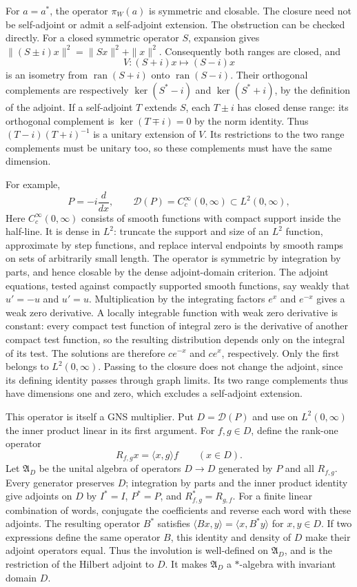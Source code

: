 For $a=a^*$, the operator $\pi_W(a)$ is symmetric and closable.
The closure need not be self-adjoint or admit a self-adjoint extension.
The obstruction can be checked directly.  For a closed symmetric operator
$S$, expansion gives
$\|(S\pm i)x\|^2=\|Sx\|^2+\|x\|^2$.
Consequently both ranges are closed, and
\[
 V:(S+i)x\longmapsto(S-i)x
\]
is an isometry from $\operatorname{ran}(S+i)$ onto
$\operatorname{ran}(S-i)$.  Their orthogonal complements are respectively
$\ker(S^*-i)$ and $\ker(S^*+i)$, by the definition of the adjoint.
If a self-adjoint $T$ extends $S$, each $T\pm i$ has closed dense range:
its orthogonal complement is $\ker(T\mp i)=0$ by the norm identity.
Thus $(T-i)(T+i)^{-1}$ is a unitary extension of $V$.
Its restrictions to the two range complements must be unitary too, so
these complements must have the same dimension.

For example,
\[
 P=-i\frac{d}{dx},\qquad \mathcal D(P)=C_c^\infty(0,\infty)
 \subset L^2(0,\infty),
\]
Here $C_c^\infty(0,\infty)$ consists of smooth functions with compact
support inside the half-line.  It is dense in $L^2$: truncate the support
and size of an $L^2$ function, approximate by step functions, and replace interval endpoints
by smooth ramps on sets of arbitrarily small length.  The operator is
symmetric by integration by parts, and hence closable by the dense
adjoint-domain criterion.  The adjoint equations, tested against compactly
supported smooth functions, say weakly that $u'=-u$ and $u'=u$.
Multiplication by the integrating factors $e^x$ and $e^{-x}$ gives a weak
zero derivative.  A locally integrable function with weak zero derivative
is constant: every compact test function of integral zero is the derivative
of another compact test function, so the resulting distribution depends
only on the integral of its test.  The solutions are therefore $ce^{-x}$
and $ce^x$, respectively.  Only the first belongs to $L^2(0,\infty)$.
Passing to the closure does not change the adjoint, since its defining
identity passes through graph limits.  Its two range complements thus
have dimensions one and zero, which excludes a self-adjoint extension.

This operator is itself a GNS multiplier.  Put $D=\mathcal D(P)$ and use
on $L^2(0,\infty)$ the inner product linear in its first argument.
For $f,g\in D$, define the rank-one operator
\[
 R_{f,g}x=\langle x,g\rangle f\qquad(x\in D).
\]
Let $\mathfrak A_D$ be the unital algebra of operators $D\to D$
generated by $P$ and all $R_{f,g}$.  Every generator preserves $D$;
integration by parts and the inner product identity give adjoints on $D$
by $I^*=I$, $P^*=P$, and $R_{f,g}^*=R_{g,f}$.  For a finite linear combination of
words, conjugate the coefficients and reverse each word with these
adjoints.  The resulting operator $B^*$ satisfies
$\langle Bx,y\rangle=\langle x,B^*y\rangle$ for $x,y\in D$.
If two expressions define the same operator $B$, this identity and density
of $D$ make their adjoint operators equal.  Thus the involution is
well-defined on $\mathfrak A_D$, and is the restriction of the Hilbert
adjoint to $D$.  It makes $\mathfrak A_D$ a $*$-algebra with invariant
domain $D$.

